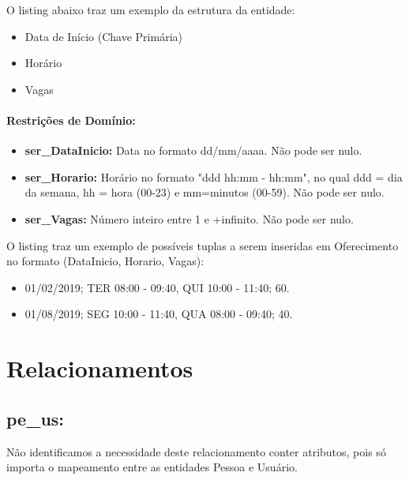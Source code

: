 \documentclass{report}
\begin{document}
	O listing abaixo traz um exemplo da estrutura da entidade:
\begin{itemize}
  \item Data de Início (Chave Primária)
  \item Horário
  \item Vagas
\end{itemize}
\paragraph{Restrições de Domínio:}
\begin{itemize}
  \item \textbf{ser\_DataInicio:} Data no formato dd/mm/aaaa. Não pode ser nulo.
  \item \textbf{ser\_Horario:} Horário no formato "ddd hh:mm - hh:mm", no qual ddd = dia da semana, hh = hora (00-23) e mm=minutos (00-59). Não pode ser nulo.
  \item \textbf{ser\_Vagas:} Número inteiro entre 1 e +infinito. Não pode ser nulo.
\end{itemize}
O listing traz um exemplo de possíveis tuplas a serem inseridas em Oferecimento no formato (DataInicio, Horario, Vagas):

\begin{itemize}
	\item 01/02/2019; TER 08:00 - 09:40, QUI 10:00 - 11:40; 60. 
	\item 01/08/2019; SEG 10:00 - 11:40, QUA 08:00 - 09:40; 40.
\end{itemize}
\section{Relacionamentos}
\subsection{pe\_us:}
Não identificamos a necessidade deste relacionamento conter atributos, pois só importa o mapeamento entre as entidades Pessoa e Usuário.
\end{document}
